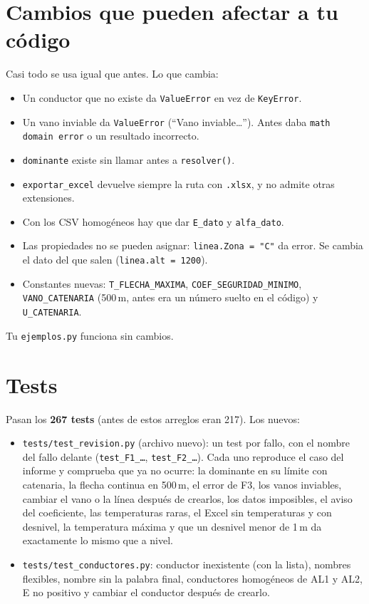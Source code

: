 \documentclass[11pt,a4paper]{article}
\newcommand{\code}[1]{\texttt{#1}}
\begin{document}
\section{Cambios que pueden afectar a tu código}

Casi todo se usa igual que antes. Lo que cambia:

\begin{itemize}[leftmargin=1.5em]
  \item Un conductor que no existe da \code{ValueError} en vez de \code{KeyError}.
  \item Un vano inviable da \code{ValueError} (``Vano inviable\ldots''). Antes daba \code{math domain error} o un resultado incorrecto.
  \item \code{dominante} existe sin llamar antes a \code{resolver()}.
  \item \code{exportar\_excel} devuelve siempre la ruta con \code{.xlsx}, y no admite otras extensiones.
  \item Con los CSV homogéneos hay que dar \code{E\_dato} y \code{alfa\_dato}.
  \item Las propiedades no se pueden asignar: \code{linea.Zona = "C"} da error. Se cambia el dato del que salen (\code{linea.alt = 1200}).
  \item Constantes nuevas: \code{T\_FLECHA\_MAXIMA}, \code{COEF\_SEGURIDAD\_MINIMO}, \code{VANO\_CATENARIA} (500\,m, antes era un número suelto en el código) y \code{U\_CATENARIA}.
\end{itemize}

Tu \code{ejemplos.py} funciona sin cambios.

\section{Tests}

Pasan los \textbf{267 tests} (antes de estos arreglos eran 217). Los nuevos:

\begin{itemize}[leftmargin=1.5em]
  \item \code{tests/test\_revision.py} (archivo nuevo): un test por fallo, con el nombre del fallo delante (\code{test\_F1\_\ldots}, \code{test\_F2\_\ldots}). Cada uno reproduce el caso del informe y comprueba que ya no ocurre: la dominante en su límite con catenaria, la flecha continua en 500\,m, el error de F3, los vanos inviables, cambiar el vano o la línea después de crearlos, los datos imposibles, el aviso del coeficiente, las temperaturas raras, el Excel sin temperaturas y con desnivel, la temperatura máxima y que un desnivel menor de 1\,m da exactamente lo mismo que a nivel.
  \item \code{tests/test\_conductores.py}: conductor inexistente (con la lista), nombres flexibles, nombre sin la palabra final, conductores homogéneos de AL1 y AL2, E no positivo y cambiar el conductor después de crearlo.
\end{itemize}
\end{document}
